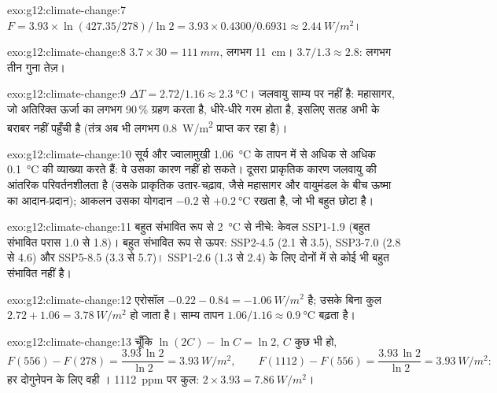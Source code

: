 \begin{solution}{exo:g12:climate-change:7}
$F = 3.93 \times \ln(427.35/278)/\ln 2 = 3.93 \times 0.4300/0.6931 \approx
\qty{2.44}{W/m^2}$।
\end{solution}

\begin{solution}{exo:g12:climate-change:8}
$3.7 \times 30 = \qty{111}{mm}$, लगभग \qty{11}{cm}। $3.7/1.3 \approx 2.8$:
लगभग तीन गुना तेज़।
\end{solution}

\begin{solution}{exo:g12:climate-change:9}
$\Delta T = 2.72/1.16 \approx \qty{2.3}{\degreeCelsius}$। जलवायु
साम्य पर नहीं है: महासागर, जो अतिरिक्त ऊर्जा का लगभग 90\,\% ग्रहण करता है,
धीरे-धीरे गरम होता है, इसलिए सतह अभी  के बराबर नहीं पहुँची है (तंत्र
अब भी लगभग \qty{0.8}{W/m^2} प्राप्त कर रहा है)।
\end{solution}

\begin{solution}{exo:g12:climate-change:10}
सूर्य और ज्वालामुखी \qty{1.06}{\degreeCelsius} के तापन में से अधिक से अधिक
\qty{0.1}{\degreeCelsius} की व्याख्या करते हैं: वे उसका कारण नहीं हो सकते। दूसरा
प्राकृतिक कारण जलवायु की आंतरिक परिवर्तनशीलता है (उसके प्राकृतिक
उतार-चढ़ाव, जैसे महासागर और वायुमंडल के बीच ऊष्मा का आदान-प्रदान); आकलन
उसका योगदान $-0.2$ से $+\qty{0.2}{\degreeCelsius}$ रखता है,
जो भी बहुत छोटा है।
\end{solution}

\begin{solution}{exo:g12:climate-change:11}
बहुत संभावित रूप से \qty{2}{\degreeCelsius} से नीचे: केवल SSP1-1.9 (बहुत संभावित परास
1.0 से 1.8)। बहुत संभावित रूप से ऊपर: SSP2-4.5 (2.1 से 3.5), SSP3-7.0 (2.8 से 4.6)
और SSP5-8.5 (3.3 से 5.7)। SSP1-2.6 (1.3 से 2.4) के लिए दोनों में से कोई भी बहुत संभावित नहीं है।
\end{solution}

\begin{solution}{exo:g12:climate-change:12}
एरोसॉल  $-0.22 - 0.84 = \qty{-1.06}{W/m^2}$ है; उसके बिना
कुल $2.72 + 1.06 = \qty{3.78}{W/m^2}$ हो जाता है। साम्य तापन
$1.06/1.16 \approx \qty{0.9}{\degreeCelsius}$ बढ़ता है।
\end{solution}

\begin{solution}{exo:g12:climate-change:13}
चूँकि $\ln(2C) - \ln C = \ln 2$, $C$ कुछ भी हो,
\[
  F(556) - F(278) = \frac{3.93\,\ln 2}{\ln 2} = \qty{3.93}{W/m^2}, \qquad
  F(1112) - F(556) = \frac{3.93\,\ln 2}{\ln 2} = \qty{3.93}{W/m^2}:
\]
हर दोगुनेपन के लिए वही । \qty{1112}{ppm} पर कुल: $2 \times 3.93 =
\qty{7.86}{W/m^2}$।
\end{solution}

